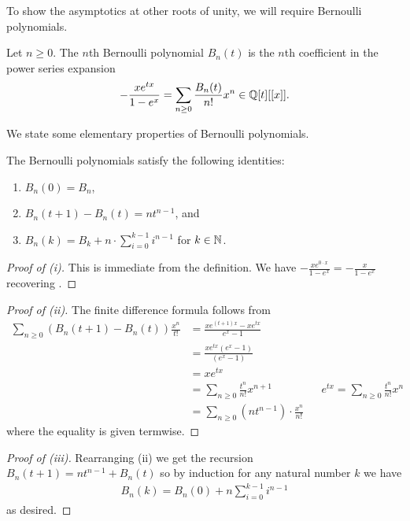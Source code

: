 To show the asymptotics at other roots of unity, we will require Bernoulli polynomials. 
\begin{definition}\label{def: Bernoulli polynomial}
    Let $n\geq0$. The $n$th Bernoulli polynomial $B_{n}(t)$ is the $n$th coefficient in the power series expansion 
    $$-\frac{xe^{tx}}{1-e^{x}}=\sum_{n\geq0}\frac{B_{n}(t)}{n!}x^{n}\in\mathbb{Q}[t][[x]].$$
\end{definition}
We state some elementary properties of Bernoulli polynomials.  
\begin{lemma}\label{lem: properties of Bernoulli polynomials}
    The Bernoulli polynomials satisfy the following identities:
    \begin{enumerate}[label=(\roman*)]
        \item $B_{n}(0)=B_{n}$, 
        \item $B_{n}(t+1)-B_{n}(t)=nt^{n-1}$, and 
        \item $B_{n}(k)=B_{k}+n\cdot\sum_{i=0}^{k-1}i^{n-1}$ for $k\in\mathbb{N}$. 
    \end{enumerate}
\end{lemma}
\begin{proof}[Proof of (i)]
    This is immediate from the definition. We have $-\frac{xe^{0\cdot x}}{1-e^{x}}=-\frac{x}{1-e^{x}}$ recovering . 
\end{proof}
\begin{proof}[Proof of (ii)]
    The finite difference formula follows from 
    \begin{align*}
        \sum_{n\geq0}\left(B_{n}(t+1)-B_{n}(t)\right)\frac{x^{n}}{t!}&= \frac{xe^{(t+1)x}-xe^{tx}}{e^{x}-1} \\
        &= \frac{xe^{tx}(e^{x}-1)}{(e^{x}-1)} \\
        &= xe^{tx} \\
        &= \sum_{n\geq0}\frac{t^{n}}{n!}x^{n+1} && e^{tx}=\sum_{n\geq0}\frac{t^{n}}{n!}x^{n} \\
        &= \sum_{n\geq0}(nt^{n-1})\cdot\frac{x^{n}}{n!} 
    \end{align*}
    where the equality is given termwise. 
\end{proof}
\begin{proof}[Proof of (iii)]
    Rearranging (ii) we get the recursion $B_{n}(t+1)=nt^{n-1}+B_{n}(t)$ so by induction for any natural number $k$ we have
    \begin{align*}
        B_{n}(k)=B_{n}(0)+n\sum_{i=0}^{k-1}i^{n-1}
    \end{align*}
    as desired. 
\end{proof}

